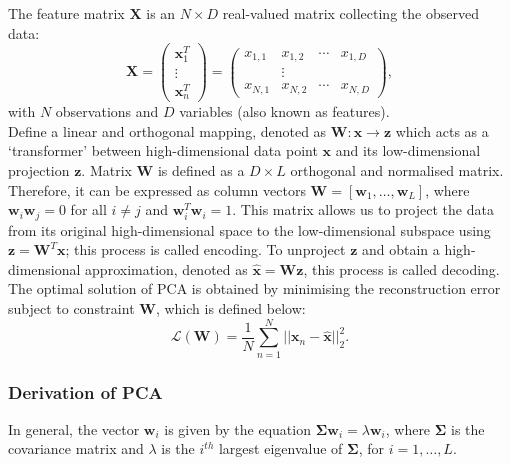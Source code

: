 \documentclass{article}\usepackage[]{graphicx}\usepackage[]{xcolor}
\numberwithin{equation}{section}
\begin{document}
{\noindent
The feature matrix $\mathbf{X}$ is an $N \times D$ real-valued matrix collecting the observed data:
$$\mathbf{X} = \left( \begin{array}{ccc}
    \mathbf{x}^{T}_{1}\\
    \vdots\\
    \mathbf{x}^{T}_{n}
    \end{array} \right) = \begin{pmatrix}
x_{1,1} & x_{1,2} & \cdots & x_{1,D} \\
 &\vdots & & \\
x_{N,1} & x_{N,2} & \cdots & x_{N,D}
\end{pmatrix},$$
\noindent
with $N$ observations and $D$ variables (also known as features).\\

\noindent
Define a linear and orthogonal mapping, denoted as $\mathbf{W}: \mathbf{x} \to \mathbf{z}$ which acts as a `transformer' between high-dimensional data point $\mathbf{x}$ and its low-dimensional projection $\mathbf{z}$. Matrix $\mathbf{W}$ is defined as a $D \times L$ orthogonal and normalised matrix. Therefore, it can be expressed as column vectors $\mathbf{W} = [\mathbf{w}_1, \dots, \mathbf{w}_L]$, where $\mathbf{w}_i \mathbf{w}_j = 0$ for all $i \ne j$ and $\mathbf{w}_i^T \mathbf{w}_i = 1$. This matrix allows us to project the data from its original high-dimensional space to the low-dimensional subspace using $\mathbf{z} = \mathbf{W}^T\mathbf{x}$; this process is called encoding. To unproject $\mathbf{z}$ and obtain a high-dimensional approximation, denoted as $\hat{\mathbf{x}} = \mathbf{W}\mathbf{z}$, this process is called decoding.\\

\noindent
The optimal solution of PCA is obtained by minimising the reconstruction error subject to constraint $\mathbf{W}$, which is defined below:
$$\mathcal{L}(\mathbf{W}) = \frac{1}{N}\sum_{n=1}^{N}||\mathbf{x}_n - \hat{\mathbf{x}}||^2_2.
$$

\subsubsection{Derivation of PCA}

In general, the vector $\mathbf{w}_i$ is given by the equation $\mathbf{\Sigma} \mathbf{w}_i = \lambda \mathbf{w}_i$, where $\mathbf{\Sigma}$ is the covariance matrix and $\lambda$ is the $i^{th}$ largest eigenvalue of $\mathbf{\Sigma}$, for $i = 1, \dots, L$.\\

}
\end{document}
